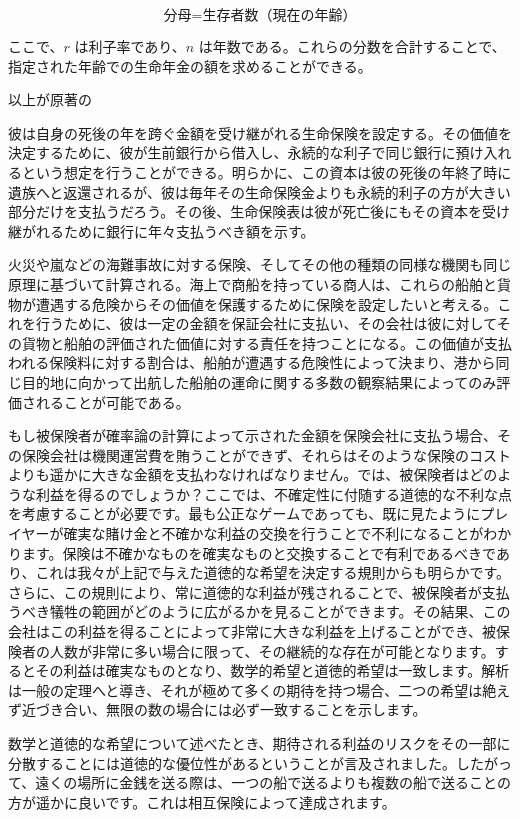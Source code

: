 \documentclass[a4paper,11pt,openany]{ltjsbook}
\begin{document}
$$
\text{分母} = \text{生存者数（現在の年齢）}
$$

ここで、$r$ は利子率であり、$n$ は年数である。これらの分数を合計することで、指定された年齢での生命年金の額を求めることができる。

以上が原著の

彼は自身の死後の年を跨ぐ金額を受け継がれる生命保険を設定する。その価値を決定するために、彼が生前銀行から借入し、永続的な利子で同じ銀行に預け入れるという想定を行うことができる。明らかに、この資本は彼の死後の年終了時に遺族へと返還されるが、彼は毎年その生命保険金よりも永続的利子の方が大きい部分だけを支払うだろう。その後、生命保険表は彼が死亡後にもその資本を受け継がれるために銀行に年々支払うべき額を示す。

火災や嵐などの海難事故に対する保険、そしてその他の種類の同様な機関も同じ原理に基づいて計算される。海上で商船を持っている商人は、これらの船舶と貨物が遭遇する危険からその価値を保護するために保険を設定したいと考える。これを行うために、彼は一定の金額を保証会社に支払い、その会社は彼に対してその貨物と船舶の評価された価値に対する責任を持つことになる。この価値が支払われる保険料に対する割合は、船舶が遭遇する危険性によって決まり、港から同じ目的地に向かって出航した船舶の運命に関する多数の観察結果によってのみ評価されることが可能である。

もし被保険者が確率論の計算によって示された金額を保険会社に支払う場合、その保険会社は機関運営費を賄うことができず、それらはそのような保険のコストよりも遥かに大きな金額を支払わなければなりません。では、被保険者はどのような利益を得るのでしょうか？ここでは、不確定性に付随する道徳的な不利な点を考慮することが必要です。最も公正なゲームであっても、既に見たようにプレイヤーが確実な賭け金と不確かな利益の交換を行うことで不利になることがわかります。保険は不確かなものを確実なものと交換することで有利であるべきであり、これは我々が上記で与えた道徳的な希望を決定する規則からも明らかです。さらに、この規則により、常に道徳的な利益が残されることで、被保険者が支払うべき犠牲の範囲がどのように広がるかを見ることができます。その結果、この会社はこの利益を得ることによって非常に大きな利益を上げることができ、被保険者の人数が非常に多い場合に限って、その継続的な存在が可能となります。するとその利益は確実なものとなり、数学的希望と道徳的希望は一致します。解析は一般の定理へと導き、それが極めて多くの期待を持つ場合、二つの希望は絶えず近づき合い、無限の数の場合には必ず一致することを示します。

数学と道徳的な希望について述べたとき、期待される利益のリスクをその一部に分散することには道徳的な優位性があるということが言及されました。したがって、遠くの場所に金銭を送る際は、一つの船で送るよりも複数の船で送ることの方が遥かに良いです。これは相互保険によって達成されます。
\end{document}
